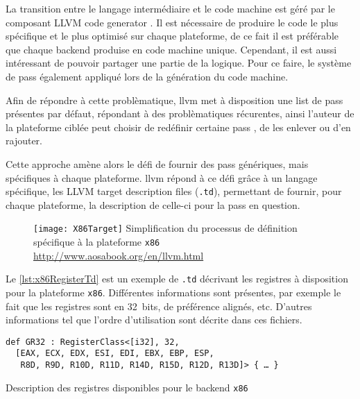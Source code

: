 La transition entre le langage intermédiaire et le code machine est géré par le composant \og LLVM code generator \fg. Il est nécessaire de produire le code le plus spécifique et le plus optimisé sur chaque plateforme, de ce fait il est préférable que chaque \og backend \fg produise en code machine unique. Cependant, il est aussi intéressant de pouvoir partager une partie de la logique. Pour ce faire, le système de \og pass \fg également appliqué lors de la génération du code machine.

Afin de répondre à cette problèmatique, \gls{llvm} met à disposition une list de \og pass \fg présentes par défaut, répondant à des problèmatiques récurentes, ainsi l'auteur de la plateforme ciblée peut choisir de redéfinir certaine \og pass \fg, de les enlever ou d'en rajouter.

Cette approche amène alors le défi de fournir des \og pass \fg génériques, mais spécifiques à chaque plateforme. \gls{llvm} répond à ce défi grâce à un langage spécifique, les \og LLVM target description files \fg (\texttt{.td}), permettant de fournir, pour chaque plateforme, la description de celle-ci pour la \og pass \fg en question.

\begin{figure}[H]
	\centering
	\texttt{[image: X86Target]}
	{Simplification du processus de définition spécifique à la plateforme \texttt{x86}}
	{\url{http://www.aosabook.org/en/llvm.html}}
	\label{fig:X86Target}
\end{figure}

Le \autoref{lst:x86RegisterTd} est un exemple de \texttt{.td} décrivant les registres à disposition pour la plateforme \texttt{x86}. Différentes informations sont présentes, par exemple le fait que les registres sont en 32~bits, de préférence alignés, etc. D'autres informations tel que l'ordre d'utilisation sont décrite dans ces fichiers.

\begin{listing}
	\begin{verbatim}
def GR32 : RegisterClass<[i32], 32,
  [EAX, ECX, EDX, ESI, EDI, EBX, EBP, ESP,
   R8D, R9D, R10D, R11D, R14D, R15D, R12D, R13D]> { … }
	\end{verbatim}
	\caption{Description des registres disponibles pour le \og backend \fg \texttt{x86}}
	\label{lst:x86RegisterTd}
\end{listing}


